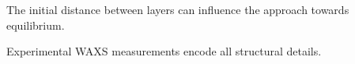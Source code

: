 \documentclass{article}
\begin{document}
  The initial distance between layers can influence the approach towards
  equilibrium. 

  Experimental WAXS measurements encode all structural details. 

  \begin{figure}[ht]
	\centering
	\begin{subfigure}[t]{0.47\linewidth}
		\centering
		\caption{}\label{fig:WAXS}
	\end{subfigure}
	\begin{subfigure}[t]{0.43\linewidth}
		\centering

\end{subfigure}
\end{figure}
\end{document}
